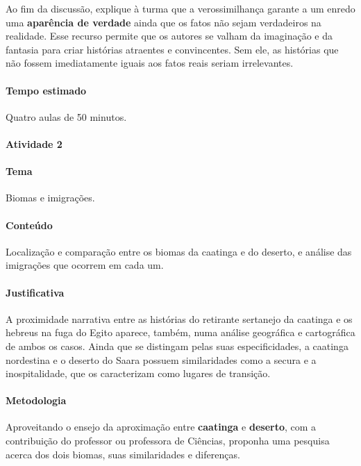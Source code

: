 \documentclass[11pt]{extarticle}
\begin{document}
Ao fim da discussão, explique à turma que a verossimilhança garante 
a um enredo uma \textbf{aparência de verdade} ainda que os fatos
não sejam verdadeiros na realidade. Esse recurso permite que os autores
se valham da imaginação e da fantasia para criar histórias atraentes
e convincentes. Sem ele, as histórias que não fossem imediatamente
iguais aos fatos reais seriam irrelevantes.

\paragraph{Tempo estimado} Quatro aulas de 50 minutos.


\paragraph{Atividade 2}

\paragraph{Tema} Biomas e imigrações.

\paragraph{Conteúdo} Localização e comparação entre os biomas
da caatinga e do deserto, e análise das imigrações que ocorrem em cada um. 

\paragraph{Justificativa} A proximidade narrativa entre as histórias do
retirante sertanejo da caatinga e os hebreus na fuga do Egito aparece, também,
numa análise geográfica e cartográfica de ambos os casos. 
Ainda que se distingam pelas suas especificidades, a caatinga nordestina e o deserto do Saara
possuem similaridades como a secura e a inospitalidade, que os caracterizam
como lugares de transição.

\paragraph{Metodologia} 
Aproveitando o ensejo da aproximação entre \textbf{caatinga} e \textbf{deserto}, 
com a contribuição do professor ou professora de Ciências, proponha uma pesquisa acerca dos 
dois biomas, suas similaridades e diferenças.

\end{document}
